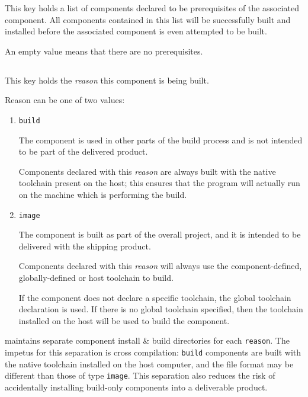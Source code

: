 This key holds a list of components declared to be prerequisites of
the associated component.  All components contained in this list will
be successfully built and installed before the associated component is
even attempted to be built.

An empty value means that there are no prerequisites.


\subsection{}\label{variables:reason}

This key holds the \emph{reason} this component is being built.

Reason can be one of two values:

  \begin{enumerate}
  \item \texttt{build}

    The component is used in other parts of the build process and is
    not intended to be part of the delivered product.

    Components declared with this \emph{reason} are always built with
    the native toolchain present on the host; this ensures that the
    program will actually run on the machine which is performing the
    build.

  \item \texttt{image}

    The component is built as part of the overall project, and it is
    intended to be delivered with the shipping product.

    Components declared with this \emph{reason} will always use the
    component-defined, globally-defined or host toolchain to build.

    If the component does not declare a specific toolchain, the global
    toolchain declaration is used.  If there is no global toolchain
    specified, then the toolchain installed on the host will be used
    to build the component.

  \end{enumerate}

  \lmsbw maintains separate component install \& build directories for
  each \texttt{reason}.  The impetus for this separation is cross
  compilation: \texttt{build} components are built with the native
  toolchain installed on the host computer, and the file format may be
  different than those of type \texttt{image}.  This separation also
  reduces the risk of accidentally installing build-only components
  into a deliverable product.

